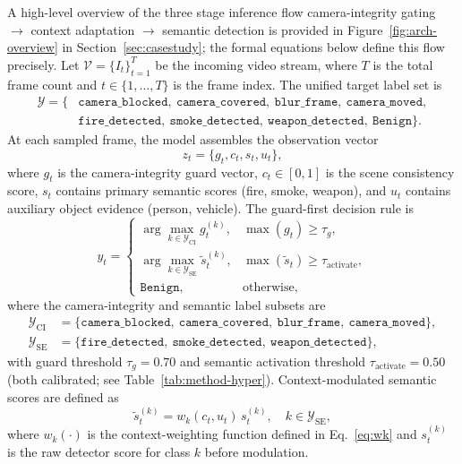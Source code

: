 \documentclass[sensors,article,submit,pdftex,moreauthors]{Definitions/mdpi}
\begin{document}
A high-level overview of the three stage inference flow  camera-integrity gating $\rightarrow$ context adaptation $\rightarrow$ semantic detection is provided in Figure~\ref{fig:arch-overview} in Section~\ref{sec:casestudy}; the formal equations below define this flow precisely. Let $\mathcal{V}=\{I_t\}_{t=1}^{T}$ be the incoming video stream, where $T$ is the total frame count and $t\in\{1,\ldots,T\}$ is the frame index. The unified target label set is
\begin{equation}
\begin{split}
\mathcal{Y}=\{&\texttt{camera\_blocked},\ \texttt{camera\_covered},\ \texttt{blur\_frame},\ \texttt{camera\_moved},\\
              &\texttt{fire\_detected},\ \texttt{smoke\_detected},\ \texttt{weapon\_detected},\ \texttt{Benign}\}.
\end{split}
\end{equation}
At each sampled frame, the model assembles the observation vector
\begin{equation}
z_t=\{g_t,c_t,s_t,u_t\},
\end{equation}
where $g_t$ is the camera-integrity guard vector, $c_t\in[0,1]$ is the scene consistency score, $s_t$ contains primary semantic scores (fire, smoke, weapon), and $u_t$ contains auxiliary object evidence (person, vehicle). The guard-first decision rule is
\begin{equation}
y_t=
\begin{cases}
\arg\max\limits_{k\in\mathcal{Y}_{\text{CI}}} g_t^{(k)}, & \max(g_t)\ge \tau_g,\\
\arg\max\limits_{k\in\mathcal{Y}_{\text{SE}}}\tilde{s}_t^{(k)}, & \max(\tilde{s}_t)\ge \tau_{\text{activate}},\\
\texttt{Benign}, & \text{otherwise},
\end{cases}
\end{equation}
where the camera-integrity and semantic label subsets are
\begin{equation}
\begin{split}
\mathcal{Y}_{\text{CI}}&=\{\texttt{camera\_blocked},\ \texttt{camera\_covered},\ \texttt{blur\_frame},\ \texttt{camera\_moved}\},\\
\mathcal{Y}_{\text{SE}}&=\{\texttt{fire\_detected},\ \texttt{smoke\_detected},\ \texttt{weapon\_detected}\},
\end{split}
\end{equation}
with guard threshold $\tau_g=0.70$ and semantic activation threshold $\tau_{\text{activate}}=0.50$ (both calibrated; see Table~\ref{tab:method-hyper}). Context-modulated semantic scores are defined as
\begin{equation}
\label{eq:wk-weight}
\tilde{s}_t^{(k)}=w_k(c_t,u_t)\,s_t^{(k)}, \quad k\in\mathcal{Y}_{\text{SE}},
\end{equation}
where $w_k(\cdot)$ is the context-weighting function defined in Eq.~\eqref{eq:wk} and $s_t^{(k)}$ is the raw detector score for class $k$ before modulation.
 
\end{document}
